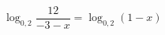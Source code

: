 \begin{ex}[type=equation]
	\begin{condition}
		$\log_{0,2} \dfrac{12}{-3-x} = \log_{0,2}(1 - x)$
	\end{condition}
\end{ex}